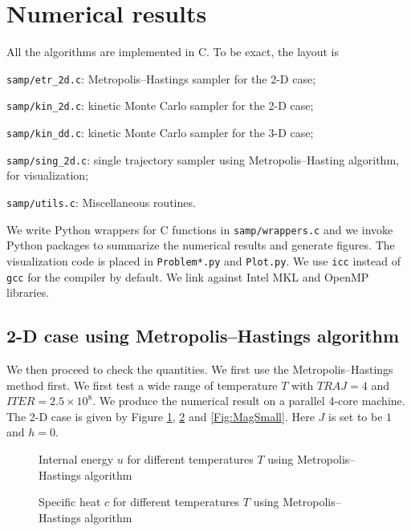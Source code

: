 \documentclass[english, nochinese]{pnote}
\begin{document}
\section{Numerical results}

All the algorithms are implemented in C. To be exact, the layout is
\begin{partlist}
\item \verb"samp/etr_2d.c": Metropolis--Hastings sampler for the 2-D case;
\item \verb"samp/kin_2d.c": kinetic Monte Carlo sampler for the 2-D case;
\item \verb"samp/kin_dd.c": kinetic Monte Carlo sampler for the 3-D case;
\item \verb"samp/sing_2d.c": single trajectory sampler using Metropolis--Hasting algorithm, for visualization;
\item \verb"samp/utils.c": Miscellaneous routines.
\end{partlist}
We write Python wrappers for C functions in \verb"samp/wrappers.c" and we invoke Python packages to summarize the numerical results and generate figures. The visualization code is placed in \verb"Problem*.py" and \verb"Plot.py". We use \verb"icc" instead of \verb"gcc" for the compiler by default. We link against Intel MKL and OpenMP libraries.


\subsection{2-D case using Metropolis--Hastings algorithm}

We then proceed to check the quantities. We first use the Metropolis--Hastings method first. We first test a wide range of temperature $T$ with $ \mathit{TRAJ} = 4 $ and $ \mathit{ITER} = 2.5 \times 10^8 $. We produce the numerical result on a parallel 4-core machine. The 2-D case is given by Figure \ref{Fig:HeatSmall}, \ref{Fig:CapSmall} and \ref{Fig:MagSmall}. Here $J$ is set to be $1$ and $ h = 0 $.

\begin{figure}[htbp]
\centering
\scalebox{0.666}{}
\caption{Internal energy $u$ for different temperatures $T$ using Metropolis--Hastings algorithm}
\label{Fig:HeatSmall}
\end{figure}

\begin{figure}[htbp]
\centering
\scalebox{0.666}{}
\caption{Specific heat $c$ for different temperatures $T$ using Metropolis--Hastings algorithm}
\label{Fig:CapSmall}
\end{figure}
\end{document}
